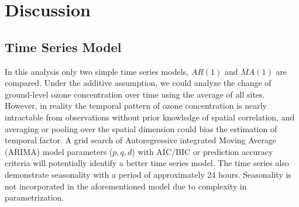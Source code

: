 \documentclass[12pt]{article}
\begin{document}
\section{Discussion}


\subsection{Time Series Model}
In this analysis only two simple time series models, $AR(1)$ and $MA(1)$ are compared. Under the additive assumption, we could analyze the change of ground-level ozone concentration over time using the average of all sites. However, in reality the temporal pattern of ozone concentration is nearly intractable from observations without prior knowledge of spatial correlation, and averaging or pooling over the spatial dimension could bias the estimation of temporal factor. A grid search of Autoregressive integrated Moving Average (ARIMA) model parameters ($p, q, d$) with AIC/BIC or prediction accuracy criteria will potentially identify a better time series model. The time series also demonstrate seasonality with a period of approximately 24 hours. Seasonality is not incorporated in the aforementioned model due to complexity in parametrization.
\end{document}
